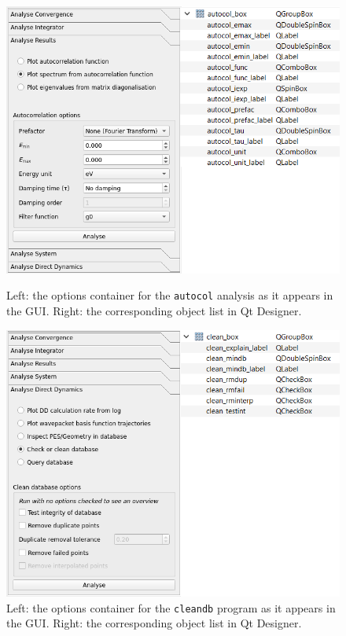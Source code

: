 \documentclass[12pt]{article}
\begin{document}
\begin{figure}[h]
    \centering
    \begin{minipage}[t]{.47\textwidth}
        \centering
        \includegraphics[width=\textwidth]{img/autocol_box.png}
        \caption{Left: the options container for the \texttt{autocol} analysis as it appears in the GUI. Right: the corresponding object list in Qt Designer.}
        \label{fig:autocol_box}
    \end{minipage}\hfill\begin{minipage}[t]{.47\textwidth}
        \centering
        \includegraphics[width=\textwidth]{img/clean_box.png}
        \caption{Left: the options container for the \texttt{cleandb} program as it appears in the GUI. Right: the corresponding object list in Qt Designer.}
        \label{fig:clean_box}
    \end{minipage}
\end{figure}
\end{document}
